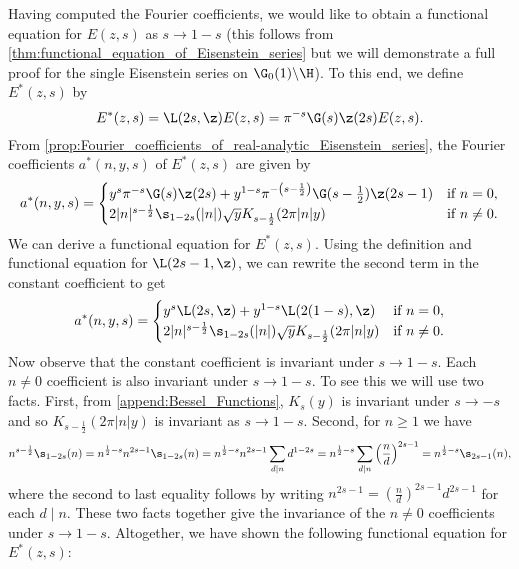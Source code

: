       Having computed the Fourier coefficients, we would like to obtain a functional equation for $E(z,s)$ as $s \to 1-s$ (this follows from \cref{thm:functional_equation_of_Eisenstein_series} but we will demonstrate a full proof for the single Eisenstein series on $\G_{0}(1)\backslash\H$). To this end, we define $E^{\ast}(z,s)$ by
      \[
        E^{\ast}(z,s) = \L(2s,\z)E(z,s) = \pi^{-s}\G(s)\z(2s)E(z,s).
      \]
      From \cref{prop:Fourier_coefficients_of_real-analytic_Eisenstein_series}, the Fourier coefficients $a^{\ast}(n,y,s)$ of $E^{\ast}(z,s)$ are given by
      \[
        a^{\ast}(n,y,s) = \begin{cases} y^{s}\pi^{-s}\G(s)\z(2s)+y^{1-s}\pi^{-\left(s-\frac{1}{2}\right)}\G(s-\frac{1}{2})\z(2s-1) & \text{if $n = 0$}, \\ 2|n|^{s-\frac{1}{2}}\s_{1-2s}(|n|)\sqrt{y}K_{s-\frac{1}{2}}(2\pi|n|y) & \text{if $n \neq 0$}. \end{cases}
      \]
      We can derive a functional equation for $E^{\ast}(z,s)$. Using the definition and functional equation for $\L(2s-1,\z)$, we can rewrite the second term in the constant coefficient to get
      \begin{equation}\label{equ:Fourier_coefficients_for_completed_real-analytic_Eisenstein_series}
        a^{\ast}(n,y,s) = \begin{cases} y^{s}\L(2s,\z)+y^{1-s}\L(2(1-s),\z) & \text{if $n = 0$}, \\ 2|n|^{s-\frac{1}{2}}\s_{1-2s}(|n|)\sqrt{y}K_{s-\frac{1}{2}}(2\pi|n|y) & \text{if $n \neq 0$}. \end{cases}
      \end{equation}
      Now observe that the constant coefficient is invariant under $s \to 1-s$. Each $n \neq 0$ coefficient is also invariant under $s \to 1-s$. To see this we will use two facts. First, from \cref{append:Bessel_Functions}, $K_{s}(y)$ is invariant under $s \to -s$ and so $K_{s-\frac{1}{2}}(2\pi|n|y)$ is invariant as $s \to 1-s$. Second, for $n \ge 1$ we have
      \[
        n^{s-\frac{1}{2}}\s_{1-2s}(n) = n^{\frac{1}{2}-s}n^{2s-1}\s_{1-2s}(n) = n^{\frac{1}{2}-s}n^{2s-1}\sum_{d \mid n}d^{1-2s} = n^{\frac{1}{2}-s}\sum_{d \mid n}\left(\frac{n}{d}\right)^{2s-1} = n^{\frac{1}{2}-s}\s_{2s-1}(n),
      \]
      where the second to last equality follows by writing $n^{2s-1} = \left(\frac{n}{d}\right)^{2s-1}d^{2s-1}$ for each $d \mid n$. These two facts together give the invariance of the $n \neq 0$ coefficients under $s \to 1-s$. Altogether, we have shown the following functional equation for $E^{\ast}(z,s)$:
